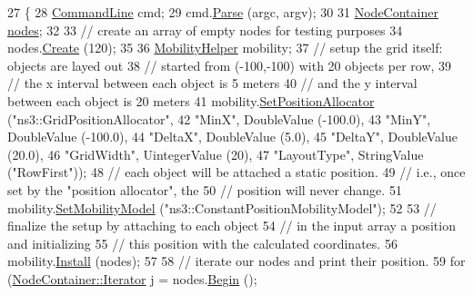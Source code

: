 \begin{DoxyCode}
27 \{
28   \hyperlink{classns3_1_1CommandLine}{CommandLine} cmd;
29   cmd.\hyperlink{classns3_1_1CommandLine_a5c10b85b3207e5ecb48d907966923156}{Parse} (argc, argv);
30 
31   \hyperlink{classns3_1_1NodeContainer}{NodeContainer} \hyperlink{visualizer-ideas_8txt_a3e1b3808014a2c68ab0cd0182e041be2}{nodes};
32 
33   \textcolor{comment}{// create an array of empty nodes for testing purposes }
34   nodes.\hyperlink{classns3_1_1NodeContainer_a787f059e2813e8b951cc6914d11dfe69}{Create} (120);
35 
36   \hyperlink{classns3_1_1MobilityHelper}{MobilityHelper} mobility;
37   \textcolor{comment}{// setup the grid itself: objects are layed out}
38   \textcolor{comment}{// started from (-100,-100) with 20 objects per row, }
39   \textcolor{comment}{// the x interval between each object is 5 meters}
40   \textcolor{comment}{// and the y interval between each object is 20 meters}
41   mobility.\hyperlink{classns3_1_1MobilityHelper_ac59d5295076be3cc11021566713a28c5}{SetPositionAllocator} (\textcolor{stringliteral}{"ns3::GridPositionAllocator"},
42                                  \textcolor{stringliteral}{"MinX"}, DoubleValue (-100.0),
43                                  \textcolor{stringliteral}{"MinY"}, DoubleValue (-100.0),
44                                  \textcolor{stringliteral}{"DeltaX"}, DoubleValue (5.0),
45                                  \textcolor{stringliteral}{"DeltaY"}, DoubleValue (20.0),
46                                  \textcolor{stringliteral}{"GridWidth"}, UintegerValue (20),
47                                  \textcolor{stringliteral}{"LayoutType"}, StringValue (\textcolor{stringliteral}{"RowFirst"}));
48   \textcolor{comment}{// each object will be attached a static position.}
49   \textcolor{comment}{// i.e., once set by the "position allocator", the}
50   \textcolor{comment}{// position will never change.}
51   mobility.\hyperlink{classns3_1_1MobilityHelper_a030275011b6f40682e70534d30280aba}{SetMobilityModel} (\textcolor{stringliteral}{"ns3::ConstantPositionMobilityModel"});
52 
53   \textcolor{comment}{// finalize the setup by attaching to each object}
54   \textcolor{comment}{// in the input array a position and initializing}
55   \textcolor{comment}{// this position with the calculated coordinates.}
56   mobility.\hyperlink{classns3_1_1MobilityHelper_a07737960ee95c0777109cf2994dd97ae}{Install} (nodes);
57 
58   \textcolor{comment}{// iterate our nodes and print their position.}
59   \textcolor{keywordflow}{for} (\hyperlink{classns3_1_1NodeContainer_aa1a9f2d2b09bfef7d066d3974bca2cc4}{NodeContainer::Iterator} j = nodes.\hyperlink{classns3_1_1NodeContainer_adf0f639aff139db107526288777eb533}{Begin} ();

\end{DoxyCode}
